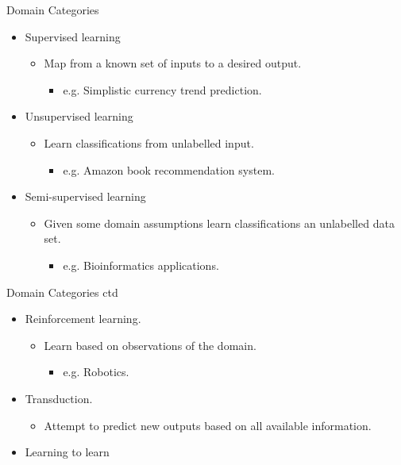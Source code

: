\documentclass[%
pdf,
colorBG,
slideColor,
tcrico,
]{prosper}
\begin{document}
\begin{slide}{Domain Categories}
\begin{itemize}
 \item Supervised learning
	\begin{itemize}
	\item Map from a known set of inputs to a desired output.
		\begin{itemize}
		\item e.g. Simplistic currency trend prediction.
		\end{itemize}
	\end{itemize}
 \item Unsupervised learning
	\begin{itemize}
	\item Learn classifications from unlabelled input.
		\begin{itemize}
		\item e.g. Amazon book recommendation system.
		\end{itemize}
	\end{itemize}
 \item Semi-supervised learning
	\begin{itemize}
	\item Given some domain assumptions learn classifications an unlabelled data set.
		\begin{itemize}
		\item e.g. Bioinformatics applications.
		\end{itemize}
	\end{itemize}
\end{itemize}
\end{slide}

\begin{slide}{Domain Categories ctd}
\begin{itemize}
 \item Reinforcement learning.
	\begin{itemize}
	\item Learn based on observations of  the domain.
		\begin{itemize}
		\item e.g. Robotics.
		\end{itemize}
	\end{itemize}
\item Transduction.
	\begin{itemize}
	\item Attempt to predict new outputs based on all available information.
	\end{itemize}
\item Learning to learn
\end{itemize}
\end{slide}
\end{document}
